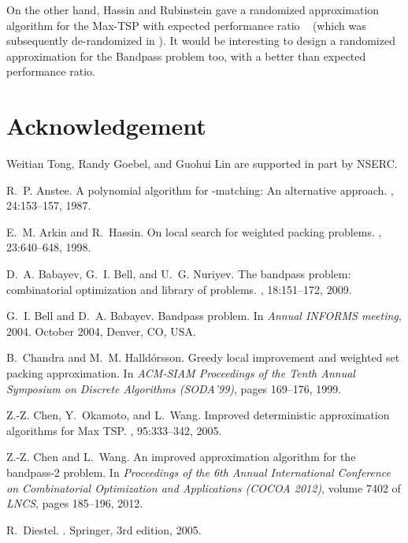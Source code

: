 \documentclass[11pt,twoside]{article}\usepackage{amssymb,latexsym,graphicx,hyperref}\usepackage{epstopdf}
\begin{document}
On the other hand, Hassin and Rubinstein gave a randomized approximation algorithm for the Max-TSP
with expected performance ratio ~\cite{HR00} (which was subsequently de-randomized in \cite{COW05}).
It would be interesting to design a randomized approximation for the Bandpass problem too, with a better than  expected performance ratio.


\section*{Acknowledgement}
Weitian Tong, Randy Goebel, and Guohui Lin are supported in part by NSERC.


\begin{thebibliography}{10}

R.~P. Anstee.
\newblock A polynomial algorithm for -matching: An alternative approach.
, 24:153--157, 1987.

E.~M. Arkin and R.~Hassin.
\newblock On local search for weighted packing problems.
, 23:640--648, 1998.

D.~A. Babayev, G.~I. Bell, and U.~G. Nuriyev.
\newblock The bandpass problem: combinatorial optimization and library of
  problems.
, 18:151--172, 2009.

G.~I. Bell and D.~A. Babayev.
\newblock Bandpass problem.
\newblock In {\em Annual INFORMS meeting}, 2004.
\newblock October 2004, Denver, CO, USA.

B.~Chandra and M.~M. Halld\'{o}rsson.
\newblock Greedy local improvement and weighted set packing approximation.
\newblock In {\em ACM-SIAM Proceedings of the Tenth Annual Symposium on
  Discrete Algorithms (SODA'99)}, pages 169--176, 1999.

Z.-Z. Chen, Y.~Okamoto, and L.~Wang.
\newblock Improved deterministic approximation algorithms for {Max} {TSP}.
, 95:333--342, 2005.

Z.-Z. Chen and L.~Wang.
\newblock An improved approximation algorithm for the bandpass-2 problem.
\newblock In {\em Proceedings of the 6th Annual International Conference on
  Combinatorial Optimization and Applications (COCOA 2012)}, volume 7402 of
  {\em LNCS}, pages 185--196, 2012.

R.~Diestel.
.
\newblock Springer, 3rd edition, 2005.


\end{thebibliography}
\end{document}
